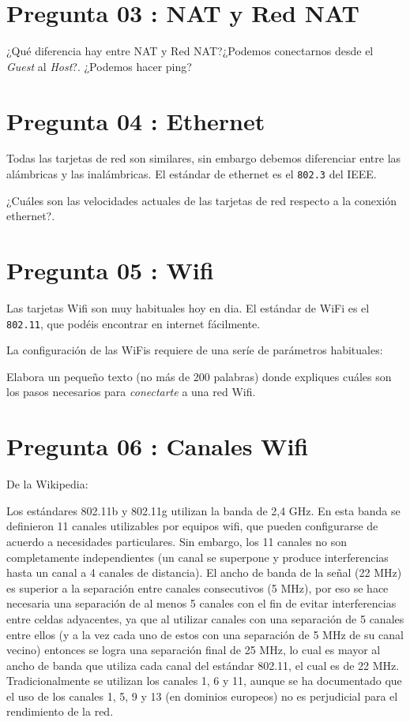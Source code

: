 \documentclass[11pt]{article}
\begin{document}
\section{Pregunta 03 : NAT y Red NAT}
\label{sec:org49d79ae}

¿Qué diferencia hay entre NAT y Red NAT?¿Podemos conectarnos desde el \emph{Guest}
al \emph{Host}?. ¿Podemos hacer ping? 

\section{Pregunta 04 : Ethernet}
\label{sec:org8b5714b}

Todas las tarjetas de red son similares, sin embargo debemos diferenciar entre
las alámbricas y las inalámbricas. El estándar de ethernet es el \texttt{802.3} del
IEEE.

¿Cuáles son las velocidades actuales de las tarjetas de red respecto a la
conexión ethernet?. 

\section{Pregunta 05 : Wifi}
\label{sec:org075cab0}

Las tarjetas Wifi son muy habituales hoy en dia. El estándar de WiFi es el
\texttt{802.11}, que podéis encontrar en internet fácilmente.

La configuración de las WiFis requiere de una seríe de parámetros habituales:

Elabora un pequeño texto (no más de 200 palabras) donde expliques cuáles son
los pasos necesarios para \emph{conectarte} a una red Wifi.

\section{Pregunta 06 : Canales Wifi}
\label{sec:orgc4aeb4f}

De la Wikipedia:

Los estándares 802.11b y 802.11g utilizan la banda de 2,4 GHz. En esta banda
se definieron 11 canales utilizables por equipos wifi, que pueden configurarse
de acuerdo a necesidades particulares. Sin embargo, los 11 canales no son
completamente independientes (un canal se superpone y produce interferencias
hasta un canal a 4 canales de distancia). El ancho de banda de la señal (22
MHz) es superior a la separación entre canales consecutivos (5 MHz), por eso
se hace necesaria una separación de al menos 5 canales con el fin de evitar
interferencias entre celdas adyacentes, ya que al utilizar canales con una
separación de 5 canales entre ellos (y a la vez cada uno de estos con una
separación de 5 MHz de su canal vecino) entonces se logra una separación final
de 25 MHz, lo cual es mayor al ancho de banda que utiliza cada canal del
estándar 802.11, el cual es de 22 MHz. Tradicionalmente se utilizan los
canales 1, 6 y 11, aunque se ha documentado que el uso de los canales 1, 5, 9
y 13 (en dominios europeos) no es perjudicial para el rendimiento de la red.
\end{document}
